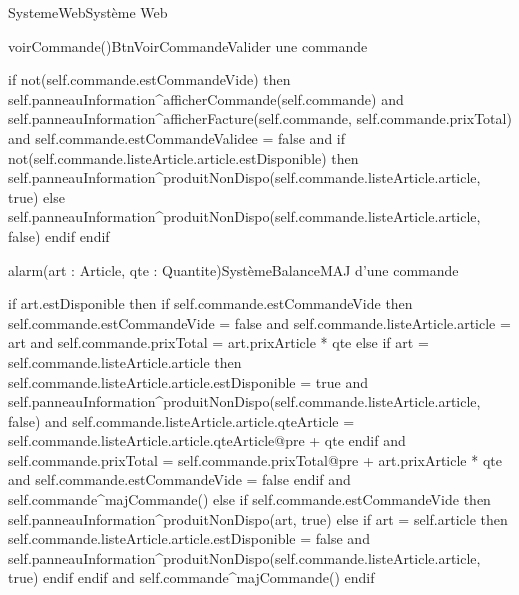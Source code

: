 \begin{OM}{SystemeWeb}{Système Web}
    \begin{OMOperation}{voirCommande()}{BtnVoirCommande}{Valider une commande}
        \begin{OMMessages}
        \end{OMMessages}
        \OMNoPre
        \begin{OMPost}
if not(self.commande.estCommandeVide) then
    self.panneauInformation^afficherCommande(self.commande)
    and
    self.panneauInformation^afficherFacture(self.commande, self.commande.prixTotal)
    and
    self.commande.estCommandeValidee = false
    and
    if not(self.commande.listeArticle.article.estDisponible) then
        self.panneauInformation^produitNonDispo(self.commande.listeArticle.article, true)
    else
        self.panneauInformation^produitNonDispo(self.commande.listeArticle.article, false)
    endif
endif
        \end{OMPost}
    \end{OMOperation}

    \begin{OMOperation}{alarm(art : Article, qte : Quantite)}{SystèmeBalance}{MAJ d'une commande}
        \begin{OMMessages}
        \end{OMMessages}
        \OMNoPre
        \begin{OMPost}
if art.estDisponible then
    if self.commande.estCommandeVide then
        self.commande.estCommandeVide = false
        and
        self.commande.listeArticle.article = art
        and
        self.commande.prixTotal = art.prixArticle * qte
    else
        if art = self.commande.listeArticle.article then
            self.commande.listeArticle.article.estDisponible = true
            and
            self.panneauInformation^produitNonDispo(self.commande.listeArticle.article, false)
            and
            self.commande.listeArticle.article.qteArticle = self.commande.listeArticle.article.qteArticle@pre + qte
        endif
        and
        self.commande.prixTotal = self.commande.prixTotal@pre + art.prixArticle * qte
        and
        self.commande.estCommandeVide = false
    endif
    and
    self.commande^majCommande()
else
    if self.commande.estCommandeVide then
        self.panneauInformation^produitNonDispo(art, true)
    else
        if art = self.article then
            self.commande.listeArticle.article.estDisponible = false
            and
            self.panneauInformation^produitNonDispo(self.commande.listeArticle.article, true)
        endif
    endif
    and
    self.commande^majCommande()
endif
        \end{OMPost}
    \end{OMOperation}


\end{OM}
